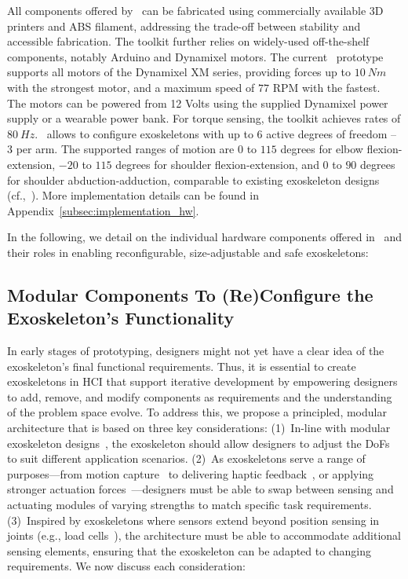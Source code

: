All components offered by \toolkit~can be fabricated using commercially available 3D printers and ABS filament, addressing the trade-off between stability and accessible fabrication. The toolkit further relies on widely-used off-the-shelf components, notably Arduino and Dynamixel motors.
The current \toolkit~prototype supports all motors of the Dynamixel XM series, providing forces up to $10~Nm$ with the strongest motor, and a maximum speed of $77$ RPM with the fastest. The motors can be powered from 12 Volts using the supplied Dynamixel power supply or a wearable power bank. 
For torque sensing, the toolkit achieves rates of $80~Hz$. 
\toolkit~allows to configure exoskeletons with up to 6 active degrees of freedom -- 3 per arm. The supported ranges of motion are $0$ to $115$ degrees for elbow flexion-extension, $-20$ to $115$ degrees for shoulder flexion-extension, and $0$ to $90$ degrees for shoulder abduction-adduction, comparable to existing exoskeleton designs (cf.,~\cite{rahman_2015,bilancia_2021,kiguchi_2008}). More implementation details can be found in Appendix~\ref{subsec:implementation_hw}.

In the following, we detail on the individual hardware components offered in \toolkit~and their roles in enabling reconfigurable, size-adjustable and safe exoskeletons:

\subsection{Modular Components To (Re)Configure the Exoskeleton's Functionality}\label{subsec:reconfigurability}

In early stages of prototyping, designers might not yet have a clear idea of the exoskeleton's final functional requirements. Thus, it is essential to create exoskeletons in HCI that support iterative development by empowering designers to add, remove, and modify components as requirements and the understanding of the problem space evolve.
To address this, we propose a principled, modular architecture that is based on three key considerations:
(1)~In-line with modular exoskeleton designs~\cite{souza_2016}, the exoskeleton should allow designers to adjust the DoFs to suit different application scenarios. (2)~As exoskeletons serve a range of purposes---from motion capture~\cite{gu_2016} to delivering haptic feedback~\cite{teng_2022}, or applying stronger actuation forces~\cite{exoJacketIndustrial}---designers must be able to swap between sensing and actuating modules of varying strengths to match specific task requirements. (3)~Inspired by exoskeletons where sensors extend beyond position sensing in joints (e.g., load cells~\cite{gull_2020}), the architecture must be able to accommodate additional sensing elements, ensuring that the exoskeleton can be adapted to changing requirements. We now discuss each consideration:


